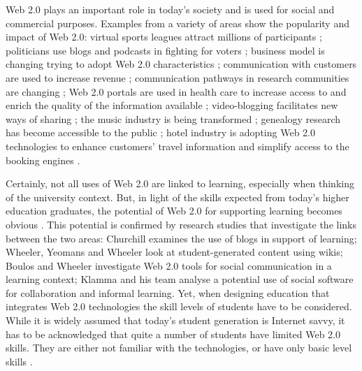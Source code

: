 Web 2.0 plays an important role in today's society and is used for social and
commercial purposes. Examples from a variety of areas show the popularity and
impact of Web 2.0: virtual sports leagues attract millions of participants
\citep{Holahan2006}; politicians use blogs and podcasts in fighting for
voters \citep{Capell2006}; business model is changing trying to adopt Web 2.0
characteristics \citep{Wirtz2010}; communication with customers are used to
increase revenue \citep{Havenstein2007}; communication pathways in research
communities are changing \citep{Ashling2007}; Web 2.0 portals are used in health
care to increase access to and enrich the quality of the information available
\citep{Gorlitz2010,Metzger2011}; video-blogging facilitates new ways of sharing
\citep{LibraryTechnologyReports2007}; the music industry is being transformed
\citep{Holahan2007}; genealogy research has become accessible to the public
\citep{MacMillan2007}; hotel industry is adopting Web 2.0 technologies to
enhance customers' travel information and simplify access to the booking engines
\citep{Leung2011}.

Certainly, not all uses of Web 2.0 are linked to learning, especially when
thinking of the university context. But, in light of the \LLLs skills expected
from today's higher education graduates, the potential of Web 2.0 for supporting
learning becomes obvious \citep{Tian2011}. This potential is confirmed by
research studies that investigate the links between the two areas: Churchill
\citeyearpar{Churchill2009} examines the use of blogs in support of learning;
Wheeler, Yeomans and Wheeler \citeyearpar{Wheeler2008} look at student-generated
content using wikis; Boulos and Wheeler \citeyearpar{Boulos2007} investigate Web
2.0 tools for social communication in a learning context; Klamma and his team
\citeyearpar{Klamma2007} analyse a potential use of social software for
collaboration and informal learning. Yet, when designing education that
integrates Web 2.0 technologies the skill levels of students have to be
considered. While it is widely assumed that today's student generation is
Internet savvy, it has to be acknowledged that quite a number of students have
limited Web 2.0 skills. They are either not familiar with the technologies, or
have only basic level skills \citep{Kennedy2008}.

